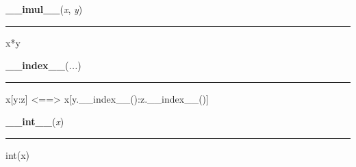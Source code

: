     \label{numpy:ndarray:__imul__}

    \vspace{0.5ex}

    \begin{boxedminipage}{\textwidth}

    \raggedright \textbf{\_\_imul\_\_}(\textit{x}, \textit{y})

    \vspace{-1.5ex}

    \rule{\textwidth}{0.5\fboxrule}

x*y
    \vspace{1ex}

    \end{boxedminipage}

    \label{numpy:ndarray:__index__}

    \vspace{0.5ex}

    \begin{boxedminipage}{\textwidth}

    \raggedright \textbf{\_\_index\_\_}(\textit{...})

    \vspace{-1.5ex}

    \rule{\textwidth}{0.5\fboxrule}

x{[}y:z{]} {\textless}=={\textgreater} x{[}y.{\_}{\_}index{\_}{\_}():z.{\_}{\_}index{\_}{\_}(){]}
    \vspace{1ex}

    \end{boxedminipage}

    \label{numpy:ndarray:__int__}

    \vspace{0.5ex}

    \begin{boxedminipage}{\textwidth}

    \raggedright \textbf{\_\_int\_\_}(\textit{x})

    \vspace{-1.5ex}

    \rule{\textwidth}{0.5\fboxrule}

int(x)
    \vspace{1ex}

    \end{boxedminipage}


